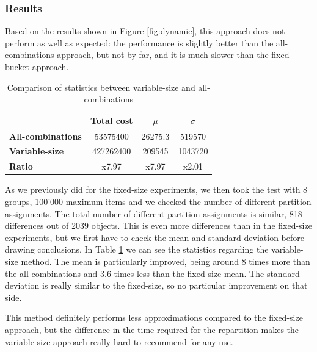 
\subsubsection{Results}
Based on the results shown in Figure \ref{fig:dynamic}, this approach does not perform as well as expected: the performance is slightly better than the all-combinations approach, but not by far, and it is much slower than the fixed-bucket approach.

\begin{table}[!htb]
  \centering
  \begin{tabular}{l c c c}
    \hline
    & \textbf{Total cost} & \textbf{$\mu$} & \textbf{$\sigma$} \\
    \hline
    \textbf{All-combinations} & 53575400 & 26275.3 & 519570\\
    \textbf{Variable-size} & 427262400 & 209545 & 1043720 \\
    \hline
    \textbf{Ratio} & x7.97 & x7.97 & x2.01 \\
    \hline
  \end{tabular}
  \caption{Comparison of statistics between variable-size and all-combinations}\label{tab:mean-stddev-variable-all}
\end{table}

As we previously did for the fixed-size experiments, we then took the test with 8 groups, 100'000 maximum items and we checked the number of different partition assignments. The total number of different partition assignments is similar, 818 differences out of 2039 objects. This is even more differences than in the fixed-size experiments, but we first have to check the mean and standard deviation before drawing conclusions. In Table \ref{tab:mean-stddev-variable-all} we can see the statistics regarding the variable-size method. The mean is particularly improved, being around 8 times more than the all-combinations and 3.6 times less than the fixed-size mean. The standard deviation is really similar to the fixed-size, so no particular improvement on that side.

This method definitely performs less approximations compared to the fixed-size approach, but the difference in the time required for the repartition makes the variable-size approach really hard to recommend for any use.

